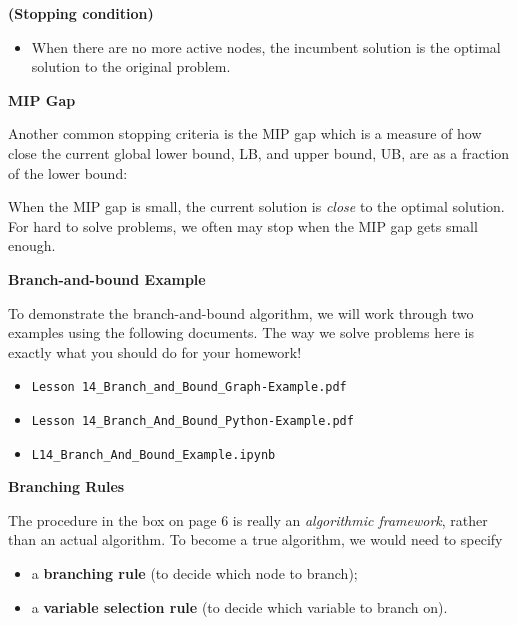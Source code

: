 \documentclass[11pt]{article}
\theoremstyle{definition}
\newcommand{\answerbox}[3]{%
  \fbox{%
    \begin{minipage}[#1]{#2}
      \hfill\vspace{#3}
    \end{minipage}
  }
}
\newcommand{\wordbox}{\answerbox{c}{1.2in}{.7cm}}
\begin{document}
\begin{tcolorbox}
\begin{itemize}
\begin{itemize}
\end{itemize}
\end{itemize}

\bigskip
\textbf{(Stopping condition)}
\begin{itemize}
\item When there are no more active nodes, the incumbent solution is the optimal solution to the original problem.
\end{itemize}
\end{tcolorbox}

\bigskip

\textbf{MIP Gap}

Another common stopping criteria is the MIP gap which is a measure of how close the current global lower bound, LB, and upper bound, UB, are as a fraction of the lower bound: \vspace{1in}

When the MIP gap is small, the current solution is \textit{close} to the optimal solution. For hard to solve problems, we often may stop when the MIP gap gets small enough.

\newpage

\textbf{Branch-and-bound Example}  

To demonstrate the branch-and-bound algorithm, we will work through two examples using the following  documents. The way we solve problems here is exactly what you should do for your homework!

\begin{itemize}
\item  \texttt{Lesson 14\_Branch\_and\_Bound\_Graph-Example.pdf}
\item  \texttt{Lesson 14\_Branch\_And\_Bound\_Python-Example.pdf}
\item  \texttt{L14\_Branch\_And\_Bound\_Example.ipynb}
\end{itemize}

\textbf{Branching Rules}

The procedure in the box on page 6 is really an \emph{algorithmic framework}, rather than an actual algorithm. 
To become a true algorithm, we would need to specify
\begin{itemize}
\item a \textbf{branching rule} (to decide which \wordbox node to branch);
\item a \textbf{variable selection rule} (to decide which \wordbox variable to branch on).
\end{itemize}
\end{document}

